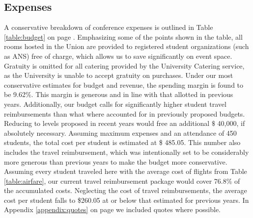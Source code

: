 
\subsection{Expenses}
A conservative breakdown of conference expenses is outlined in Table \ref{table:budget} on page \pageref{table:budget}. Emphasizing some of the points shown in the table, all rooms hosted in the Union are provided to registered student organizations (such as ANS) free of charge, which allows us to save significantly on event space. Gratuity is omitted for all catering provided by the University Catering service, as the University is unable to accept gratuity on purchases. 
Under our most conservative estimates for budget and revenue, the spending margin is found to be 9.62\%. This margin is generous and in line with that allotted in previous years. Additionally, our budget calls for significantly higher student travel reimbursements than what where accounted for in previously proposed budgets. Reducing to levels proposed in recent years would free an additional $\$$ 40,000, if absolutely necessary. 
Assuming maximum expenses and an attendance of 450 students, the total cost per student is estimated at \$ 485.05. This number also includes the travel reimbursement, which was intentionally set to be considerably more generous than previous years to make the budget more conservative. Assuming every student traveled here with the average cost of flights from Table \ref{table:airfare}, our current travel reimbursement package would cover 76.8\% of the accumulated costs. Neglecting the cost of travel reimbursements, the average cost per student falls to \$260.05 at or below that estimated for previous years. In Appendix \ref{appendix:quotes} on page \pageref{appendix:quotes} we included quotes where possible.

